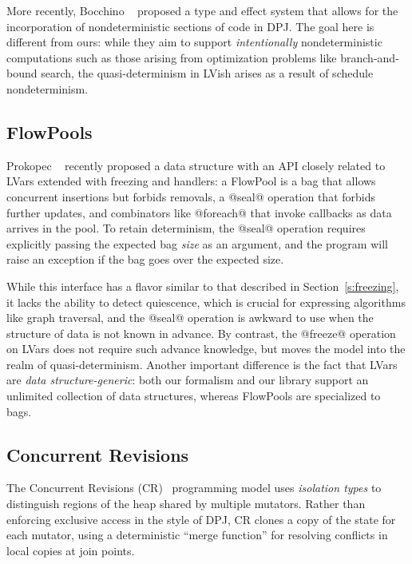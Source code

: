 \documentclass{article}
\begin{document}
More recently, Bocchino \etal~\cite{dpj-popl} proposed a type and
effect system that allows for the incorporation of nondeterministic
sections of code in DPJ.  The goal here is different from ours: while
they aim to support \emph{intentionally} nondeterministic computations
such as those arising from optimization problems like branch-and-bound
search, the quasi-determinism in LVish arises as a result of schedule
nondeterminism.

\subsection{FlowPools}

Prokopec \etal~\cite{flowpools} recently proposed a data structure
with an API closely related to LVars extended with freezing and
handlers: a FlowPool is a bag that allows concurrent insertions but
forbids removals, a @seal@ operation that forbids further updates,
and combinators like @foreach@ that invoke callbacks as data
arrives in the pool.  To retain determinism, the @seal@ operation
requires explicitly passing the expected bag \emph{size} as an
argument, and the program will raise an exception if the bag goes over
the expected size.

While this interface has a flavor similar to that described in
Section~\ref{s:freezing}, it lacks the ability to detect quiescence,
which is crucial for expressing algorithms like graph traversal, and
the @seal@ operation is awkward to use when the structure of data is
not known in advance.  By contrast, the @freeze@ operation on LVars
does not require such advance knowledge, but moves the model into the
realm of quasi-determinism.  Another important difference is the fact
that LVars are \emph{data structure-generic}: both our formalism and
our library support an unlimited collection of data structures,
whereas FlowPools are specialized to bags.

\subsection{Concurrent Revisions}

The Concurrent Revisions (CR)~\cite{concurrent-revisions-haskell11}
programming model uses \emph{isolation types} \cite{isolation-types}
to distinguish regions of the heap shared by multiple mutators.
Rather than enforcing exclusive access in the style of DPJ, CR clones
a copy of the state for each mutator, using a deterministic ``merge
function'' for resolving conflicts in local copies at join points.
\end{document}
